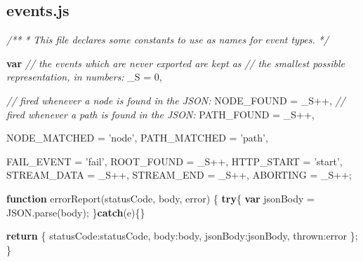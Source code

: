 \documentclass[12pt, ]{article}
\newenvironment{Shaded}{}{}
\newcommand{\KeywordTok}[1]{\textcolor[rgb]{0.00,0.44,0.13}{\textbf{{#1}}}}
\newcommand{\DataTypeTok}[1]{\textcolor[rgb]{0.56,0.13,0.00}{{#1}}}
\newcommand{\DecValTok}[1]{\textcolor[rgb]{0.25,0.63,0.44}{{#1}}}
\newcommand{\StringTok}[1]{\textcolor[rgb]{0.25,0.44,0.63}{{#1}}}
\newcommand{\CommentTok}[1]{\textcolor[rgb]{0.38,0.63,0.69}{\textit{{#1}}}}
\newcommand{\OtherTok}[1]{\textcolor[rgb]{0.00,0.44,0.13}{{#1}}}
\newcommand{\FunctionTok}[1]{\textcolor[rgb]{0.02,0.16,0.49}{{#1}}}
\newcommand{\NormalTok}[1]{{#1}}
\begin{document}
\pagebreak

\subsection{events.js}\label{headerux5fevents}

\label{src_events}

\begin{Shaded}
\begin{Highlighting}[]
\CommentTok{/**}
\CommentTok{ * This file declares some constants to use as names for event types.}
\CommentTok{ */}

\KeywordTok{var} \CommentTok{// the events which are never exported are kept as }
    \CommentTok{// the smallest possible representation, in numbers:}
    \NormalTok{_S = }\DecValTok{0}\NormalTok{,}

    \CommentTok{// fired whenever a node is found in the JSON:}
    \NormalTok{NODE_FOUND    = _S++,}
    \CommentTok{// fired whenever a path is found in the JSON:      }
    \NormalTok{PATH_FOUND    = _S++,   }
    
    \NormalTok{NODE_MATCHED  = }\StringTok{'node'}\NormalTok{,}
    \NormalTok{PATH_MATCHED  = }\StringTok{'path'}\NormalTok{,}
         
    \NormalTok{FAIL_EVENT    = }\StringTok{'fail'}\NormalTok{,    }
    \NormalTok{ROOT_FOUND    = _S++,    }
    \NormalTok{HTTP_START    = }\StringTok{'start'}\NormalTok{,}
    \NormalTok{STREAM_DATA   = _S++,}
    \NormalTok{STREAM_END    = _S++,}
    \NormalTok{ABORTING      = _S++;}
    
\KeywordTok{function} \FunctionTok{errorReport}\NormalTok{(statusCode, body, error) \{}
   \KeywordTok{try}\NormalTok{\{}
      \KeywordTok{var} \NormalTok{jsonBody = }\OtherTok{JSON}\NormalTok{.}\FunctionTok{parse}\NormalTok{(body);}
   \NormalTok{\}}\KeywordTok{catch}\NormalTok{(e)\{\}}

   \KeywordTok{return} \NormalTok{\{}
      \DataTypeTok{statusCode}\NormalTok{:statusCode,}
      \DataTypeTok{body}\NormalTok{:body,}
      \DataTypeTok{jsonBody}\NormalTok{:jsonBody,}
      \DataTypeTok{thrown}\NormalTok{:error}
   \NormalTok{\};}
\NormalTok{\}    }
\end{Highlighting}
\end{Shaded}

\pagebreak

\end{document}

